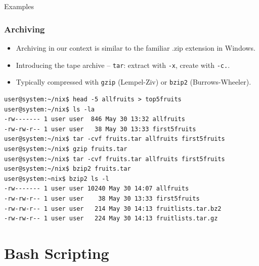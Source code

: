 \documentclass[10pt]{beamer}
\begin{document}
\subsection{}
\begin{frame}[fragile]{Examples}
\frametitle{Archiving}
\begin{itemize}
\item Archiving in our context is similar to the familiar .zip extension in Windows. \vspace{0.05in}
\item Introducing the tape archive -- \texttt{tar}: extract with \texttt{-x}, create with \texttt{-c.}.\vspace{0.05in}
\item Typically compressed with \texttt{gzip} (Lempel-Ziv) or \texttt{bzip2} (Burrows-Wheeler).\vspace{0.05in}
\end{itemize}
\begin{lstlisting}[style=BashInputStyle]
user@system:~/nix$ head -5 allfruits > top5fruits
user@system:~/nix$ ls -la
-rw------- 1 user user  846 May 30 13:32 allfruits
-rw-rw-r-- 1 user user   38 May 30 13:33 first5fruits
user@system:~/nix$ tar -cvf fruits.tar allfruits first5fruits
user@system:~/nix$ gzip fruits.tar
user@system:~/nix$ tar -cvf fruits.tar allfruits first5fruits
user@system:~/nix$ bzip2 fruits.tar
user@system:~nix$ bzip2 ls -l
-rw------- 1 user user 10240 May 30 14:07 allfruits
-rw-rw-r-- 1 user user    38 May 30 13:33 first5fruits
-rw-rw-r-- 1 user user   214 May 30 14:13 fruitlists.tar.bz2
-rw-rw-r-- 1 user user   224 May 30 14:13 fruitlists.tar.gz
\end{lstlisting}\vspace{0.05in}
\end{frame}

\section{Bash Scripting}
\end{document}

